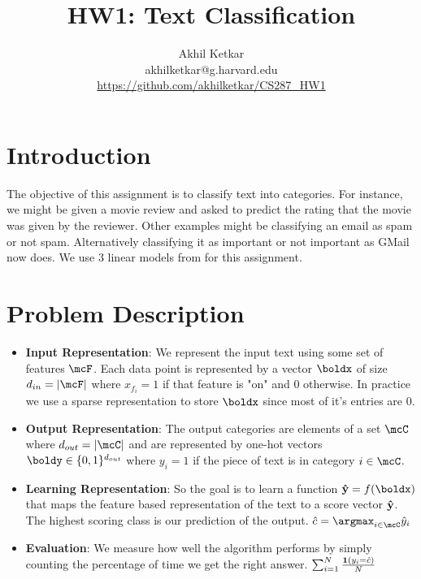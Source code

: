 \documentclass[11pt]{article}
\title{HW1: Text Classification}
\author{Akhil Ketkar \\ akhilketkar@g.harvard.edu \\ \url{https://github.com/akhilketkar/CS287_HW1}}
\begin{document}
\maketitle{}

\section{Introduction}

The objective of this assignment is to classify text into categories. For
instance, we might be given a movie review and asked to predict the rating
that the movie was given by the reviewer. Other examples might be classifying
an email as spam or not spam. Alternatively classifying it as
important or not important as GMail now does. We use 3 linear models from
\citep{murphy2012machine} for this assignment.

\section{Problem Description}

\begin{itemize}
  \item \textbf{Input Representation}: We represent the input text using some set of features
  $\mcF$. Each data point is represented by a vector $\boldx$ of size
  $d_{in} = |\mcF|$ where $x_{f_i} = 1$ if that feature is "on" and 0 otherwise.
  In practice we use a sparse representation to store $\boldx$ since most of
  it's entries are 0.

  \item \textbf{Output Representation}: The output categories are elements of a set
  $\mcC$ where $d_{out} = |\mcC|$
  and are represented by one-hot vectors $\boldy \in \{0,1\}^{d_{out}}$ where
  $y_i = 1$ if the piece of text is in category $i \in \mcC$.

  \item \textbf{Learning Representation}:  So the goal is to learn a function
  $\bold{\hat{y}} = f(\boldx)$ that maps the
  feature based representation of the text to a score vector $\bold{\hat{y}}$. The
  highest scoring class is our prediction of the output.
  $\hat{c} = \argmax_{i \in \mcC} \hat{y}_i$

  \item \textbf{Evaluation}: We measure how well the algorithm performs by simply
  counting the percentage
  of time we get the right answer. $\sum_{i=1}^N \frac{\bold1(y_i = \hat{c})}{N}$

\end{itemize}
\end{document}
